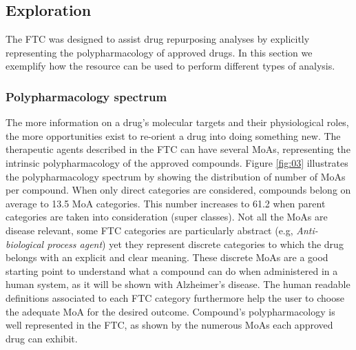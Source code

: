 \documentclass{bioinfo}
\begin{document}
\subsection{Exploration}\label{exploration}
The FTC was designed to assist drug repurposing analyses by explicitly representing the polypharmacology of 
approved drugs. In this section we exemplify how the resource can be used to perform different types of analysis.

\subsubsection{Polypharmacology spectrum}
The more information on a drug’s molecular targets and their physiological roles, the more opportunities 
exist to re-orient a drug into doing something new. The therapeutic agents described in the FTC can have several MoAs, 
representing the intrinsic polypharmacology of the approved compounds. Figure \ref{fig:03} illustrates the polypharmacology 
spectrum by showing the distribution of number of MoAs per compound. When only direct categories are considered, compounds belong on average
to 13.5 MoA categories. This number increases to 61.2 when parent categories are taken into consideration (super classes).
Not all the MoAs are disease relevant, 
some FTC categories are particularly abstract (e.g, \emph{Anti-biological process agent}) yet they represent discrete 
categories to which the drug belongs with an explicit and clear meaning. These discrete MoAs are a good starting 
point to understand what a compound can do when administered in a human system, as it will be shown with Alzheimer's disease.
The human readable definitions 
associated to each FTC category furthermore help the user to choose the adequate MoA for the desired outcome.
Compound's polypharmacology is 
well represented in the FTC, as shown by the numerous MoAs each approved drug can exhibit.
\end{document}
